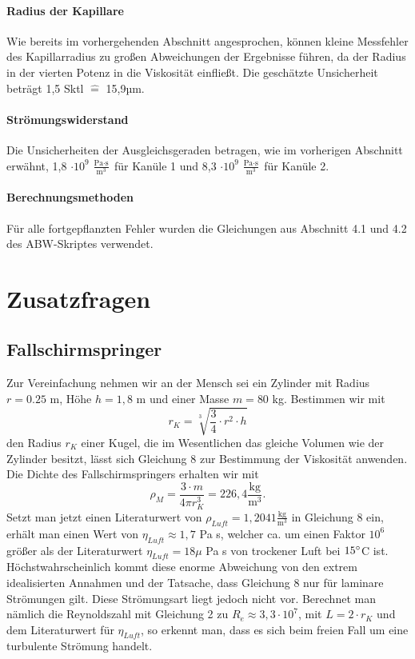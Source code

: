 \documentclass{article}
\begin{document}
\paragraph{Radius der Kapillare}
Wie bereits im vorhergehenden Abschnitt angesprochen, können kleine Messfehler des Kapillarradius zu großen Abweichungen der Ergebnisse führen, da der Radius in der vierten Potenz in die Viskosität einfließt.
Die geschätzte Unsicherheit beträgt 1,5 Sktl $\widehat{=}$ 15,9µm.
\paragraph{Strömungswiderstand}
Die Unsicherheiten der Ausgleichsgeraden betragen, wie im vorherigen Abschnitt erwähnt, 1,8 $\cdot 10^9 \ \frac{\textrm{Pa}\cdot \textrm{s}}{\textrm{m}^3}$ für Kanüle 1 und 8,3 $\cdot 10^9 \ \frac{\textrm{Pa}\cdot \textrm{s}}{\textrm{m}^3}$ für Kanüle 2.
\paragraph{Berechnungsmethoden}
Für alle fortgepflanzten Fehler wurden die Gleichungen aus Abschnitt 4.1 und 4.2 des ABW-Skriptes \cite{2} verwendet.
\section{Zusatzfragen}
\subsection{Fallschirmspringer}
Zur Vereinfachung nehmen wir an der Mensch sei ein Zylinder
mit Radius $r=0.25$ m, Höhe $h = 1,8$ m und einer Masse $m = 80
$ kg. Bestimmen wir mit
\begin{equation}
    r_K = \sqrt[3]{\frac{3}{4} \cdot r^2 \cdot h}
\end{equation}
den Radius $r_K$ einer Kugel, die im Wesentlichen das gleiche Volumen wie der Zylinder besitzt, lässt sich Gleichung 8 zur Bestimmung der Viskosität anwenden. Die Dichte des Fallschirmspringers erhalten wir mit
\begin{equation}
    \rho_M = \frac{3 \cdot m}{4\pi r_K^3} = 226,4   \frac{\textrm{kg}}{\textrm{m}^3}.
\end{equation}
Setzt man jetzt einen Literaturwert von $\rho_{Luft}= 1,2041 \frac{\textrm{kg}}{\textrm{m}^3}$ \cite{3} in Gleichung 8 ein, erhält man einen Wert von $\eta_{Luft} \approx 1,7$ Pa s, welcher ca. um einen Faktor $10^6$ größer als der Literaturwert $\eta_{Luft} = 18 \mu$ Pa s \cite{4} von trockener Luft bei $15 \degree $C ist. Höchstwahrscheinlich kommt diese enorme Abweichung von den extrem idealisierten Annahmen und der Tatsache, dass Gleichung 8 nur für laminare Strömungen gilt. Diese Strömungsart liegt jedoch nicht vor. Berechnet man nämlich die Reynoldszahl mit Gleichung 2 zu $R_e \approx 3,3 \cdot 10^7$, mit $L = 2 \cdot r_K$ und dem Literaturwert für $\eta_{Luft}$, so erkennt man, dass es sich beim freien Fall um eine turbulente Strömung handelt.
\end{document}
